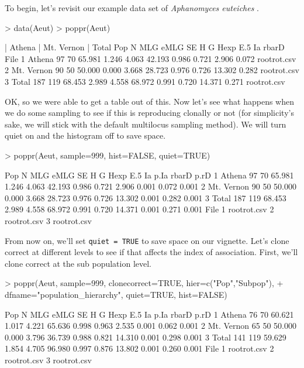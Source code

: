 \documentclass[letterpaper]{article}
\begin{document}
To begin, let's revisit our example data set of \textit{Aphanomyces euteiches} \cite{Grunwald:2006}.
\begin{Schunk}
\begin{Sinput}
> data(Aeut)
> poppr(Aeut)
\end{Sinput}
\begin{Soutput}
| Athena 
| Mt. Vernon 
| Total 
         Pop   N MLG   eMLG    SE     H      G  Hexp   E.5     Ia rbarD        File
1     Athena  97  70 65.981 1.246 4.063 42.193 0.986 0.721  2.906 0.072 rootrot.csv
2 Mt. Vernon  90  50 50.000 0.000 3.668 28.723 0.976 0.726 13.302 0.282 rootrot.csv
3      Total 187 119 68.453 2.989 4.558 68.972 0.991 0.720 14.371 0.271 rootrot.csv
\end{Soutput}
\end{Schunk}
OK, so we were able to get a table out of this. Now let's see what happens when we do some sampling to see if this is reproducing clonally or not (for simplicity's sake, we will stick with the default multilocus sampling method). We will turn quiet on and the histogram off to save space.
\begin{Schunk}
\begin{Sinput}
> poppr(Aeut, sample=999, hist=FALSE, quiet=TRUE)
\end{Sinput}
\end{Schunk}
\begin{Schunk}
\begin{Soutput}
         Pop   N MLG   eMLG    SE     H      G  Hexp   E.5     Ia  p.Ia rbarD  p.rD
1     Athena  97  70 65.981 1.246 4.063 42.193 0.986 0.721  2.906 0.001 0.072 0.001
2 Mt. Vernon  90  50 50.000 0.000 3.668 28.723 0.976 0.726 13.302 0.001 0.282 0.001
3      Total 187 119 68.453 2.989 4.558 68.972 0.991 0.720 14.371 0.001 0.271 0.001
         File
1 rootrot.csv
2 rootrot.csv
3 rootrot.csv
\end{Soutput}
\end{Schunk}
From now on, we'll set \texttt{quiet = TRUE} to save space on our vignette. Let's clone correct at different levels to see if that affects the index of association. First, we'll clone correct at the sub population level.
\begin{Schunk}
\begin{Sinput}
> poppr(Aeut, sample=999, clonecorrect=TRUE, hier=c("Pop","Subpop"), 
+       dfname="population_hierarchy", quiet=TRUE, hist=FALSE)
\end{Sinput}
\end{Schunk}
\begin{Schunk}
\begin{Soutput}
         Pop   N MLG   eMLG    SE     H      G  Hexp   E.5     Ia  p.Ia rbarD  p.rD
1     Athena  76  70 60.621 1.017 4.221 65.636 0.998 0.963  2.535 0.001 0.062 0.001
2 Mt. Vernon  65  50 50.000 0.000 3.796 36.739 0.988 0.821 14.310 0.001 0.298 0.001
3      Total 141 119 59.629 1.854 4.705 96.980 0.997 0.876 13.802 0.001 0.260 0.001
         File
1 rootrot.csv
2 rootrot.csv
3 rootrot.csv
\end{Soutput}
\end{Schunk}
\end{document}
